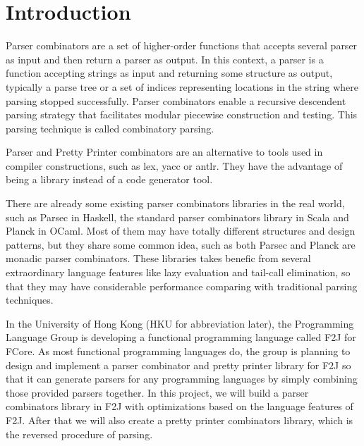 \chapter{Introduction}

Parser combinators are a set of higher-order functions that accepts several parser as input and then return a parser as output. In this context, a parser is a function accepting strings as input and returning some structure as output, typically a parse tree or a set of indices representing locations in the string where parsing stopped successfully. Parser combinators enable a recursive descendent parsing strategy that facilitates modular piecewise construction and testing. This parsing technique is called combinatory parsing.

Parser and Pretty Printer combinators are an alternative to tools used in compiler constructions, such as lex, yacc or antlr. They have the advantage of being a library instead of a code generator tool.

There are already some existing parser combinators libraries in the real world, such as Parsec \cite{Leijen:2002} in Haskell, the standard parser combinators library in Scala and Planck \cite{Planck} in OCaml. Most of them may have totally different structures and design patterns, but they share some common idea, such as both Parsec and Planck are monadic parser combinators. These libraries takes benefic from several extraordinary language features like lazy evaluation and tail-call elimination, so that they may have considerable performance comparing with traditional parsing techniques.

In the University of Hong Kong (HKU for abbreviation later), the Programming Language Group is developing a functional programming language called F2J for FCore. As most functional programming languages do, the group is planning to design and implement a parser combinator and pretty printer library for F2J so that it can generate parsers for any programming languages by simply combining those provided parsers together. In this project, we will build a parser combinators library in F2J with optimizations based on the language features of F2J. After that we will also create a pretty printer combinators library, which is the reversed procedure of parsing.
